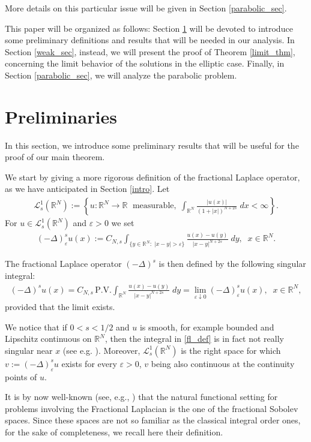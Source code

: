 \documentclass[reqno,twoside]{amsart}
\numberwithin{equation}{section}
\def\RR{{\mathbb{R}}}
\newcommand{\fl}[2]{(-\Delta)^#1#2}
\newcommand{\cns}{C_{N,s}}
\begin{document}
More details on this particular issue will be given in Section \ref{parabolic_sec}.

This paper will be organized as follows: Section \ref{prel} will be devoted to introduce some preliminary definitions and results that will be needed in our analysis. In Section \ref{weak_sec}, instead, we will present the proof of Theorem \ref{limit_thm}, concerning the limit behavior of the solutions in the elliptic case. Finally, in Section \ref{parabolic_sec}, we will analyze the parabolic problem.

\section{Preliminaries}\label{prel}

In this section, we introduce some preliminary results that will be useful for the proof of our main theorem.

We start by giving a more rigorous definition of the fractional Laplace operator, as we have anticipated in Section \ref{intro}. Let 
\begin{align*}
	\mathcal L_s^{1}(\RR^N):=\left\{u:\RR^N\to\RR\;\mbox{ measurable},\; \int_{\RR^N}\frac{|u(x)|}{(1+|x|)^{N+2s}}\;dx<\infty\right\}.
\end{align*}
For $u\in \mathcal L_s^{1}(\RR^N)$ and $\varepsilon>0$ we set
\begin{align*}
	(-\Delta)_\varepsilon^s u(x):= C_{N,s}\int_{\{y\in\RR^N:\;|x-y|>\varepsilon\}}\frac{u(x)-u(y)}{|x-y|^{N+2s}}\;dy,\;\;x\in\RR^N.
\end{align*}

\noindent The fractional Laplace operator $\fl{s}{}$ is then defined by the following singular integral:
\begin{align}\label{fl_def}
	\fl{s}{u}(x)=\cns\,\mbox{P.V.}\int_{\RR^N}\frac{u(x)-u(y)}{|x-y|^{N+2s}}\;dy=\lim_{\varepsilon\downarrow 0}(-\Delta)_\varepsilon^s u(x),\;\;x\in\RR^N,
\end{align}
provided that the limit exists. 

We notice that if $0<s<1/2$ and $u$ is smooth, for example bounded and Lipschitz continuous on $\RR^N$, then the integral in \eqref{fl_def} is in fact not really singular near $x$ (see e.g. \cite[Remark 3.1]{dihitchhiker}). Moreover, $\mathcal L_s^{1}(\RR^N)$ is the right space for which $ v:=(-\Delta)_\varepsilon^s u$ exists for every $\varepsilon>0$, $v$ being also continuous at the continuity points of  $u$. 

It is by now well-known (see, e.g., \cite{dihitchhiker}) that the natural functional setting for problems involving the Fractional Laplacian is the one of the fractional Sobolev spaces. Since these spaces are not so familiar as the classical integral order ones, for the sake of completeness, we recall here their definition. 
\end{document}
